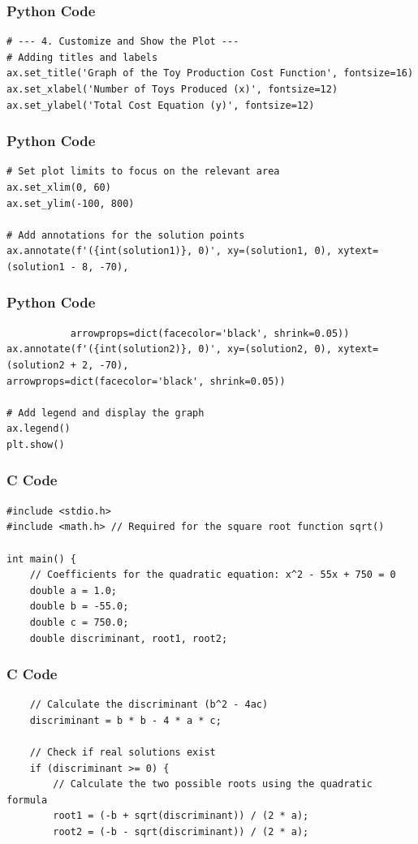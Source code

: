 \documentclass{beamer}
\begin{document}
\begin{frame}[fragile]
\frametitle{Python Code}
\begin{lstlisting}
# --- 4. Customize and Show the Plot ---
# Adding titles and labels
ax.set_title('Graph of the Toy Production Cost Function', fontsize=16)
ax.set_xlabel('Number of Toys Produced (x)', fontsize=12)
ax.set_ylabel('Total Cost Equation (y)', fontsize=12)
\end{lstlisting}
\end{frame}

\begin{frame}[fragile]
\frametitle{Python Code}
\begin{lstlisting}
# Set plot limits to focus on the relevant area
ax.set_xlim(0, 60)
ax.set_ylim(-100, 800)

# Add annotations for the solution points
ax.annotate(f'({int(solution1)}, 0)', xy=(solution1, 0), xytext=(solution1 - 8, -70),
 \end{lstlisting}
\end{frame}

\begin{frame}[fragile]
\frametitle{Python Code}
\begin{lstlisting}           arrowprops=dict(facecolor='black', shrink=0.05))
ax.annotate(f'({int(solution2)}, 0)', xy=(solution2, 0), xytext=(solution2 + 2, -70),
arrowprops=dict(facecolor='black', shrink=0.05))

# Add legend and display the graph
ax.legend()
plt.show()
\end{lstlisting}
\end{frame}

\begin{frame}[fragile]
\frametitle{C Code}
\begin{lstlisting}
#include <stdio.h>
#include <math.h> // Required for the square root function sqrt()

int main() {
    // Coefficients for the quadratic equation: x^2 - 55x + 750 = 0
    double a = 1.0;
    double b = -55.0;
    double c = 750.0;
    double discriminant, root1, root2;
\end{lstlisting}
\end{frame}

\begin{frame}[fragile]
\frametitle{C Code}
\begin{lstlisting}
    // Calculate the discriminant (b^2 - 4ac)
    discriminant = b * b - 4 * a * c;

    // Check if real solutions exist
    if (discriminant >= 0) {
        // Calculate the two possible roots using the quadratic formula
        root1 = (-b + sqrt(discriminant)) / (2 * a);
        root2 = (-b - sqrt(discriminant)) / (2 * a);
\end{lstlisting}
\end{frame}
\end{document}

